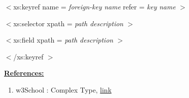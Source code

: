 \documentclass[12pt]{article}
\begin{document}
\begin{enumerate}[1.]
\begin{itemize}
\begin{itemize}
            \bigskip

            $<$xs:keyref name = \textit{foreign-key name} refer = \textit{key name} $>$

            \quad$<$xs:selector xpath = \textit{path description} $>$

            \quad$<$xs:field xpath = \textit{path description} $>$

            $<$/xs:keyref $>$
        \end{itemize}
    \end{itemize}

    \bigskip

    \underline{\textbf{References:}}

    \bigskip

    \begin{enumerate}[1.]
        \item w3School : Complex Type, \href{https://www.w3schools.com/xml/el_complextype.asp}{link}
    \end{enumerate}

\end{enumerate}
\end{document}
